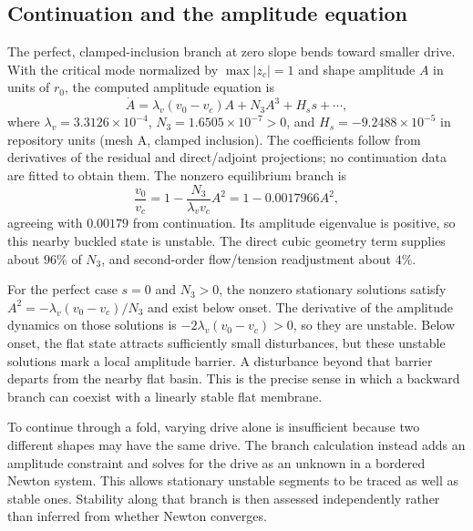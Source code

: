 \subsection{Continuation and the amplitude equation}


The perfect, clamped-inclusion branch at zero slope bends toward smaller drive. With the critical mode normalized by $\max|z_c|=1$ and shape amplitude $A$ in units of $r_0$, the computed amplitude equation is
\begin{equation}
\dot A=\lambda_v(v_0-v_c)A+N_3A^3+H_s s+\cdots,\label{eq:landau}
\end{equation}
where $\lambda_v=3.3126\times10^{-4}$, $N_3=1.6505\times10^{-7}>0$, and $H_s=-9.2488\times10^{-5}$ in repository units (mesh A, clamped inclusion). The coefficients follow from derivatives of the residual and direct/adjoint projections; no continuation data are fitted to obtain them. The nonzero equilibrium branch is
\begin{equation}
\frac{v_0}{v_c}=1-\frac{N_3}{\lambda_vv_c}A^2
=1-0.0017966A^2,\label{eq:branch}
\end{equation}
agreeing with $0.00179$ from continuation. Its amplitude eigenvalue is positive, so this nearby buckled state is unstable. The direct cubic geometry term supplies about $96\%$ of $N_3$, and second-order flow/tension readjustment about $4\%$.


For the perfect case $s=0$ and $N_3>0$, the nonzero stationary solutions satisfy $A^2=-\lambda_v(v_0-v_c)/N_3$ and exist below onset. The derivative of the amplitude dynamics on those solutions is $-2\lambda_v(v_0-v_c)>0$, so they are unstable. Below onset, the flat state attracts sufficiently small disturbances, but these unstable solutions mark a local amplitude barrier. A disturbance beyond that barrier departs from the nearby flat basin. This is the precise sense in which a backward branch can coexist with a linearly stable flat membrane.

To continue through a fold, varying drive alone is insufficient because two different shapes may have the same drive. The branch calculation instead adds an amplitude constraint and solves for the drive as an unknown in a bordered Newton system. This allows stationary unstable segments to be traced as well as stable ones. Stability along that branch is then assessed independently rather than inferred from whether Newton converges.




